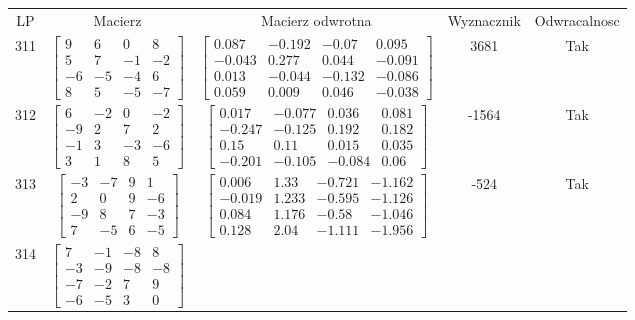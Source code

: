 \documentclass[a4paper,12pt]{article}
\begin{document}
\bgroup {} \vspace{0.2in} \begin{tabular}{c c c c c}
LP & Macierz & Macierz odwrotna & Wyznacznik & Odwracalnosc\\
311
&
$\begin{bmatrix} 9 & 6 & 0 & 8 \\ 5 & 7 & -1 & -2 \\ -6 & -5 & -4 & 6 \\ 8 & 5 & -5 & -7 \end{bmatrix}$
&
$\begin{bmatrix} 0.087 & -0.192 & -0.07 & 0.095 \\ -0.043 & 0.277 & 0.044 & -0.091 \\ 0.013 & -0.044 & -0.132 & -0.086 \\ 0.059 & 0.009 & 0.046 & -0.038 \end{bmatrix}$
&
3681
&
Tak
\\
312
&
$\begin{bmatrix} 6 & -2 & 0 & -2 \\ -9 & 2 & 7 & 2 \\ -1 & 3 & -3 & -6 \\ 3 & 1 & 8 & 5 \end{bmatrix}$
&
$\begin{bmatrix} 0.017 & -0.077 & 0.036 & 0.081 \\ -0.247 & -0.125 & 0.192 & 0.182 \\ 0.15 & 0.11 & 0.015 & 0.035 \\ -0.201 & -0.105 & -0.084 & 0.06 \end{bmatrix}$
&
-1564
&
Tak
\\
313
&
$\begin{bmatrix} -3 & -7 & 9 & 1 \\ 2 & 0 & 9 & -6 \\ -9 & 8 & 7 & -3 \\ 7 & -5 & 6 & -5 \end{bmatrix}$
&
$\begin{bmatrix} 0.006 & 1.33 & -0.721 & -1.162 \\ -0.019 & 1.233 & -0.595 & -1.126 \\ 0.084 & 1.176 & -0.58 & -1.046 \\ 0.128 & 2.04 & -1.111 & -1.956 \end{bmatrix}$
&
-524
&
Tak
\\
314
&
$\begin{bmatrix} 7 & -1 & -8 & 8 \\ -3 & -9 & -8 & -8 \\ -7 & -2 & 7 & 9 \\ -6 & -5 & 3 & 0 \end{bmatrix}$

\end{tabular}
\end{document}
